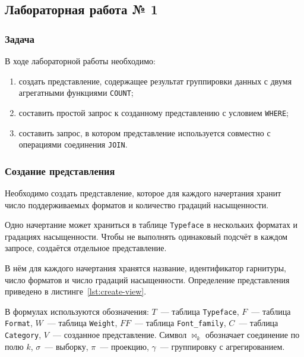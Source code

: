 \subsection{Лабораторная работа № 1}

\subsubsection{Задача}

В ходе лабораторной работы необходимо:

\begin{enumerate}
    \item создать представление, содержащее результат группировки данных с
    двумя агрегатными функциями \texttt{COUNT};
    \item составить простой запрос к созданному представлению с условием
    \texttt{WHERE};
    \item составить запрос, в котором представление используется совместно с
    операциями соединения \texttt{JOIN}.
\end{enumerate}

\subsubsection{Создание представления}

Необходимо создать представление, которое для каждого начертания хранит число
поддерживаемых форматов и количество градаций насыщенности.

Одно начертание может храниться в таблице \texttt{Typeface} в
нескольких форматах и градациях насыщенности. Чтобы не выполнять одинаковый
подсчёт в каждом запросе, создаётся отдельное представление.

В нём для каждого начертания хранятся название, идентификатор гарнитуры, число
форматов и число градаций насыщенности. Определение представления приведено в
листинге~\ref{lst:create-view}.

В формулах используются обозначения: $T$~--- таблица
\texttt{Typeface}, $F$~--- таблица
\texttt{Format}, $W$~--- таблица
\texttt{Weight}, $FF$~--- таблица
\texttt{Font_family}, $C$~--- таблица
\texttt{Category}, $V$~--- созданное представление. Символ
$\bowtie_{k}$ обозначает соединение по полю $k$, $\sigma$~---
выборку, $\pi$~--- проекцию, $\gamma$~--- группировку с агрегированием.


